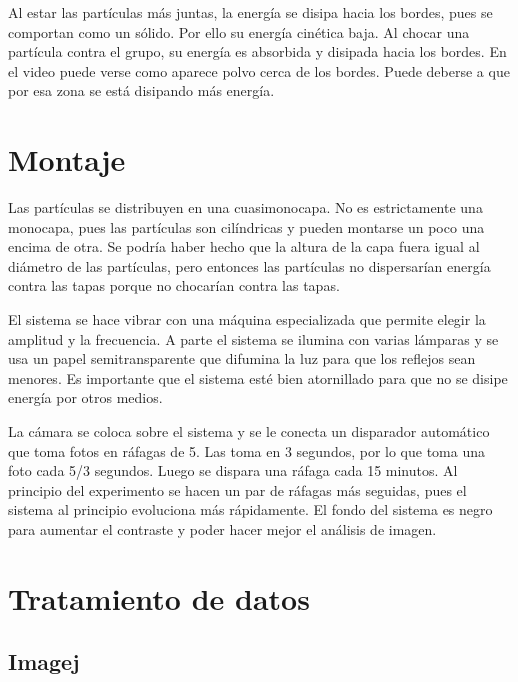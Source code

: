 \documentclass[twoside]{article}
\begin{document}
\begin{multicols}{2}
Al estar las part\'iculas m\'as juntas, la energ\'ia se disipa hacia los bordes, pues se comportan como un s\'olido. Por ello su energ\'ia cin\'etica baja. Al chocar una part\'icula contra el grupo, su energ\'ia es absorbida y disipada hacia los bordes. En el video puede verse como aparece polvo cerca de los bordes. Puede deberse a que por esa zona se est\'a disipando m\'as energ\'ia.


\section*{Montaje}

Las part\'iculas se distribuyen en una cuasimonocapa. No es estrictamente una monocapa, pues las part\'iculas son cil\'indricas y pueden montarse un poco una encima de otra. Se podr\'ia haber hecho que la altura de la capa fuera igual al di\'ametro de las part\'iculas, pero entonces las part\'iculas no dispersar\'ian energ\'ia contra las tapas porque no chocar\'ian contra las tapas.

El sistema se hace vibrar con una m\'aquina especializada que permite elegir la amplitud y la frecuencia. A parte el sistema se ilumina con varias l\'amparas y se usa un papel semitransparente que difumina la luz para que los reflejos sean menores. Es importante que el sistema est\'e bien atornillado para que no se disipe energ\'ia por otros medios.

La c\'amara se coloca sobre el sistema y se le conecta un disparador autom\'atico que toma fotos en r\'afagas de 5. Las toma en 3 segundos, por lo que toma una foto cada 5/3 segundos. Luego se dispara una r\'afaga cada 15 minutos. Al principio del experimento se hacen un par de r\'afagas m\'as seguidas, pues el sistema al principio evoluciona m\'as r\'apidamente. El fondo del sistema es negro para aumentar el contraste y poder hacer mejor el an\'alisis de imagen.


\section*{Tratamiento de datos}

\subsection*{Imagej}


\end{multicols}
\end{document}
